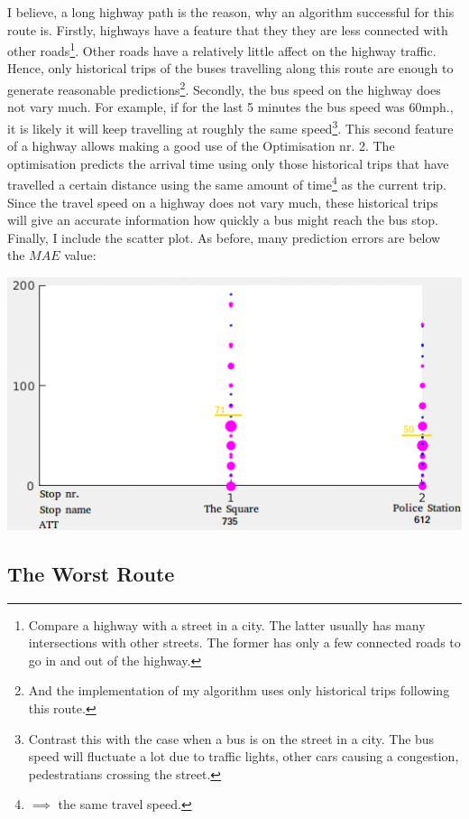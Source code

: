 \documentclass[12pt,a4paper,oneside,openright]{report}
\begin{document}
I believe, a long highway path is the reason, why an algorithm successful for this route is.
Firstly, highways have a feature that they they are less connected with other
roads\footnote{Compare a highway with a street in a city. The latter usually has many
intersections with other streets. The former has only a few connected roads to go in and out
of the highway.}. Other roads have a relatively little affect on the highway traffic.
Hence, only historical trips of the buses travelling along this route are enough to generate
reasonable predictions\footnote{And the implementation of my algorithm uses only historical trips
following this route.}. Secondly, the bus speed on the highway does not vary
much. For example, if for the last 5 minutes the bus speed was $60$mph., it is 
likely it will keep travelling at roughly the same speed\footnote{Contrast this with the
case when a bus is on the street in a city. The bus speed will fluctuate a lot due to
traffic lights, other cars causing a congestion, pedestratians crossing the street.}.
This second feature of a highway allows making a good use of the
Optimisation nr. 2. The optimisation predicts the arrival time using only those
historical trips that have travelled a certain distance using the same amount of
time\footnote{$\implies$ the same travel speed.} as the current trip. Since the travel
speed on a highway does not vary much, these historical trips will give an accurate
information how quickly a bus might reach the bus stop. \\

Finally, I include the scatter plot. As before, many prediction errors are below the $MAE$ value:

\includegraphics[scale=0.5]{figs/best_scatter_plot.png}

\subsection*{The Worst Route}
\end{document}

